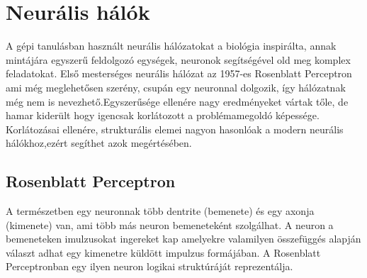 
\chapter{Neurális hálók}\label{ch:nn}

A gépi tanulásban használt neurális hálózatokat a biológia inspirálta, annak mintájára egyszerű feldolgozó egységek, neuronok segítségével old meg komplex feladatokat. 
Első mesterséges neurális hálózat az 1957-es Rosenblatt Perceptron ami még meglehetősen szerény, csupán egy neuronnal dolgozik, így hálózatnak még nem is nevezhető.Egyszerűsége ellenére nagy eredményeket vártak tőle, de hamar kiderült hogy igencsak korlátozott a problémamegoldó képessége. Korlátozásai ellenére, strukturális elemei nagyon hasonlóak a modern neurális hálókhoz,ezért segíthet azok megértésében.

\section{Rosenblatt Perceptron}

A természetben egy neuronnak több dentrite (bemenete) és egy axonja (kimenete) van, ami több más neuron bemeneteként szolgálhat. A neuron a bemeneteken imulzusokat ingereket kap amelyekre valamilyen összefüggés alapján választ adhat egy kimenetre küldött impulzus formájában. A Rosenblatt Perceptronban egy ilyen neuron logikai struktúráját reprezentálja. 


